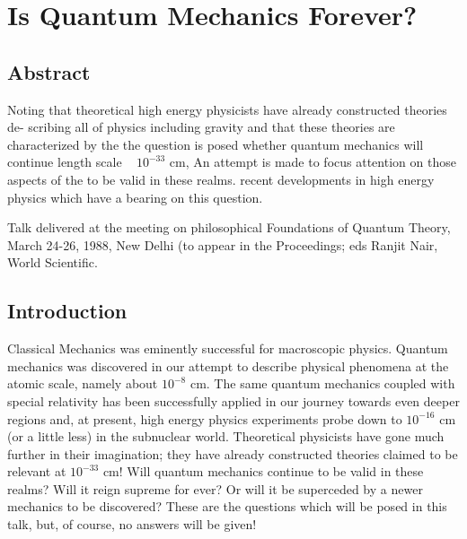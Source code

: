\chapter[Is Quantum Mechanics Forever? ]{Is Quantum Mechanics Forever?}\label{chap8}  





\section*{Abstract}

Noting that theoretical high energy physicists have already constructed theories de- scribing all of physics including gravity and that these theories are characterized by the the question is posed whether quantum mechanics will continue length scale ~ $10^{-33}$ cm,
An attempt is made to focus attention on those aspects of the to be valid in these realms. recent developments in high energy physics which have a bearing on this question. 

Talk delivered at the meeting on philosophical Foundations of Quantum Theory, March 24-26, 1988, New Delhi (to appear in the Proceedings; eds Ranjit Nair, World Scientific.

\section{Introduction}

Classical Mechanics was eminently successful for macroscopic physics. Quantum mechanics was discovered in our attempt to describe physical phenomena at the atomic scale,
namely about $10^{-8}$ cm. The same quantum mechanics coupled with special relativity has
been successfully applied in our journey towards even deeper regions and, at present, high
energy physics experiments probe down to $10^{-16}$ cm (or a little less) in the subnuclear world. Theoretical physicists have gone much further in their imagination; they have already constructed theories claimed to be relevant at $10^{-33}$ cm! Will quantum mechanics continue to be valid in these realms? Will it reign supreme for ever? Or will it be superceded by a newer mechanics to be discovered? These are the questions which will be
posed in this talk, but, of course, no answers will be given! 


